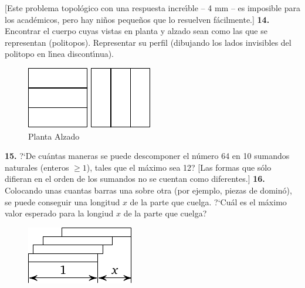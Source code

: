 \documentclass[12pt]{article}  %
\begin{document}
[Este problema topol\'ogico con una respuesta incre\'{\i}ble -- 4 mm -- es imposible para los acad\'emicos,
 pero hay ni\~nos peque\~nos que lo resuelven f\'acilmente.]  
\newline\newline\quad
{\bf 14.} Encontrar el cuerpo cuyas vistas en planta y alzado sean como las que se representan (politopos).
Representar su perfil (dibujando los lados invisibles del politopo en l\'{\i}nea discont\'{\i}nua).
\begin{figure}[h]
\centering
\footnotesize
\includegraphics[scale=1]{taskbook-99} \qquad\qquad
\includegraphics[scale=1]{taskbook-98}
\\[2pt]
\hspace{1pt} 
Planta
\hspace{43pt} Alzado
\end{figure}
\newline\quad
{\bf 15.} ?`De cu\'antas maneras se puede descomponer el n\'umero 64 en 10 sumandos naturales (enteros $\ge 1$),
tales que el m\'aximo sea 12?
[Las formas que s\'olo difieran en el orden de los sumandos no se cuentan como diferentes.]
\newline\newline\quad
{\bf 16.} Colocando unas cuantas barras una sobre otra (por ejemplo, piezas de domin\'o),
se puede conseguir una longitud $x$ de la parte que cuelga. ?`Cu\'al es el m\'aximo valor esperado para la longiud 
 $x$ de la parte que cuelga?
\begin{figure}[h!]
\centering
\footnotesize
\includegraphics[scale=1]{taskbook-97}
\end{figure}
\newpage
\end{document}
